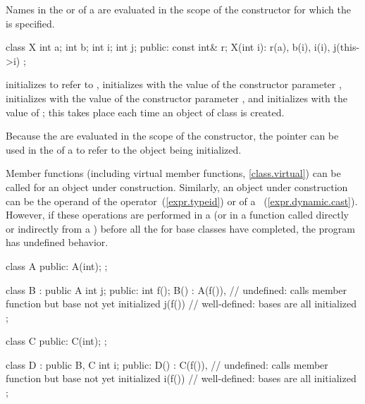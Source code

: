 \pnum
{}%
Names in the
or 
of a
are evaluated in the scope of the constructor for which the
is specified.
\begin{example}

\begin{codeblock}
class X {
  int a;
  int b;
  int i;
  int j;
public:
  const int& r;
  X(int i): r(a), b(i), i(i), j(this->i) { }
};
\end{codeblock}

initializes
to refer to
,
initializes
with the value of the constructor parameter
,
initializes
with the value of the constructor parameter
,
and initializes
with the value of
;
this takes place each time an object of class
is created.
\end{example}
\begin{note}
Because the
are evaluated in the scope of the constructor, the
pointer can be used in the
of a
to refer to the object being initialized.
\end{note}

\pnum
{}%
Member functions (including virtual member functions, \ref{class.virtual}) can be
called for an object under construction.
Similarly, an object under construction can be the operand of the
operator~(\ref{expr.typeid}) or of a
~(\ref{expr.dynamic.cast}).
However, if these operations are performed in a
(or in a function called directly or indirectly from a
)
before all the
for base classes have completed, the program has undefined behavior.
\begin{example}
\begin{codeblock}
class A {
public:
  A(int);
};

class B : public A {
  int j;
public:
  int f();
  B() : A(f()),     // undefined: calls member function but base  not yet initialized
  j(f()) { }        // well-defined: bases are all initialized
};

class C {
public:
  C(int);
};

class D : public B, C {
  int i;
public:
  D() : C(f()),     // undefined: calls member function but base  not yet initialized
  i(f()) { }        // well-defined: bases are all initialized
};
\end{codeblock}
\end{example}

